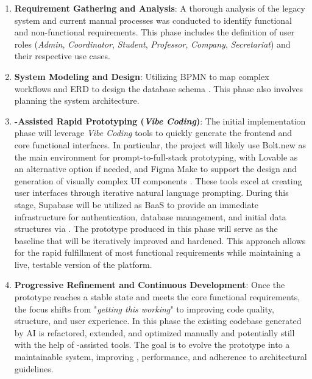   \begin{enumerate}
    \item{
      \textbf{Requirement Gathering and Analysis}: 
      A thorough analysis of the legacy system and current manual processes was conducted to identify functional and non-functional requirements. This phase includes the definition of user roles 
      (\textit{Admin}, \textit{Coordinator}, \textit{Student}, \textit{Professor}, \textit{Company}, \textit{Secretariat}) and their respective use cases.
      }
    \item{\textbf{System Modeling and Design}: 
      Utilizing \gls{BPMN} to map complex workflows \cite{omg-bpmn-2011} and \gls{ERD} 
      to design the database schema \cite{Chen1976ERModel}. This phase also involves 
      planning the system architecture.
      }
    \item{
      \textbf{-Assisted Rapid Prototyping (\textit{Vibe Coding})}: 
      The initial implementation phase will leverage \textit{Vibe Coding} tools to quickly 
      generate the frontend and core functional 
      interfaces. 
      In particular, the project will likely use Bolt.new as the main environment for prompt-to-full-stack prototyping, with 
      Lovable as an alternative option if needed, and Figma Make to support the design and generation of visually complex UI components \cite{vibecoding2025}. 
      These tools excel at creating user interfaces 
      through iterative natural language prompting. 
      During this stage, Supabase will be utilized as \gls{BaaS} to provide an immediate 
      infrastructure for authentication, database management, 
      and initial data structures via \cite{supabase-2019}. 
      The prototype produced in this phase will serve as the baseline that will be iteratively improved and hardened.
      This approach allows for the rapid fulfillment of most functional requirements while 
      maintaining a live, testable version of the platform.
      }
    \item{
      \textbf{Progressive Refinement and Continuous Development}: 
      Once the prototype reaches a stable state and meets the core functional requirements,
      the focus shifts from "\textit{getting this working}" to improving code quality, structure, and user experience.
      In this phase the existing codebase generated by AI is refactored, extended, and optimized manually and potentially still
      with the help of -assisted tools. The goal is to evolve the prototype into a maintainable 
      system, improving , performance, and adherence to architectural guidelines.
}
\end{enumerate}
